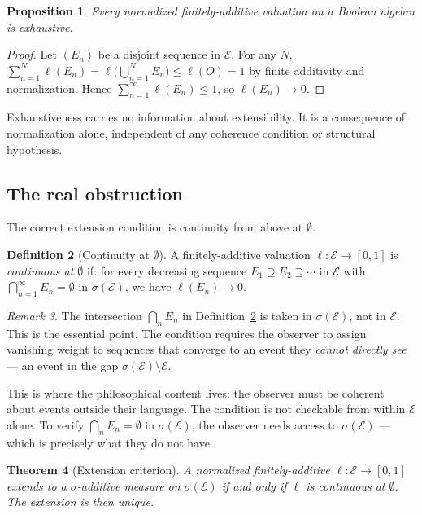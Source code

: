 \documentclass[12pt]{article}
\newtheorem{theorem}{Theorem}[section]
\newtheorem{proposition}[theorem]{Proposition}
\theoremstyle{definition}
\newtheorem{definition}[theorem]{Definition}
\theoremstyle{remark}
\newtheorem{remark}[theorem]{Remark}
\newcommand{\E}{\mathcal{E}}
\newcommand{\sigE}{\sigma(\mathcal{E})}
\begin{document}
\begin{proposition}
\label{prop:exhaustiveness-trivial}
Every normalized finitely-additive valuation on a Boolean algebra is exhaustive.
\end{proposition}

\begin{proof}
Let $(E_n)$ be a disjoint sequence in $\E$.  For any $N$,
$\sum_{n=1}^N \ell(E_n) = \ell\bigl(\bigcup_{n=1}^N E_n\bigr) \leq \ell(O) = 1$
by finite additivity and normalization.  Hence $\sum_{n=1}^\infty \ell(E_n) \leq 1$,
so $\ell(E_n) \to 0$.
\end{proof}

\noindent Exhaustiveness carries no information about extensibility.  It is a
consequence of normalization alone, independent of any coherence condition or
structural hypothesis.

\subsection{The real obstruction}

The correct extension condition is continuity from above at $\emptyset$.

\begin{definition}[Continuity at $\emptyset$]
\label{def:cont-empty}
A finitely-additive valuation $\ell : \E \to [0,1]$ is \emph{continuous at
$\emptyset$} if: for every decreasing sequence $E_1 \supseteq E_2 \supseteq \cdots$
in $\E$ with $\bigcap_{n=1}^\infty E_n = \emptyset$ in $\sigE$, we have $\ell(E_n)
\to 0$.
\end{definition}

\begin{remark}
The intersection $\bigcap_n E_n$ in Definition~\ref{def:cont-empty} is taken in
$\sigE$, not in $\E$.  This is the essential point.  The condition requires the
observer to assign vanishing weight to sequences that converge to an event they
\emph{cannot directly see} --- an event in the gap $\sigE \setminus \E$.

This is where the philosophical content lives: the observer must be coherent about
events outside their language.  The condition is not checkable from within $\E$ alone.
To verify $\bigcap_n E_n = \emptyset$ in $\sigE$, the observer needs access to
$\sigE$ --- which is precisely what they do not have.
\end{remark}

\begin{theorem}[Extension criterion]
\label{thm:extension-criterion}
A normalized finitely-additive $\ell : \E \to [0,1]$ extends to a $\sigma$-additive
measure on $\sigE$ if and only if $\ell$ is continuous at $\emptyset$.  The extension
is then unique.
\end{theorem}
\end{document}
